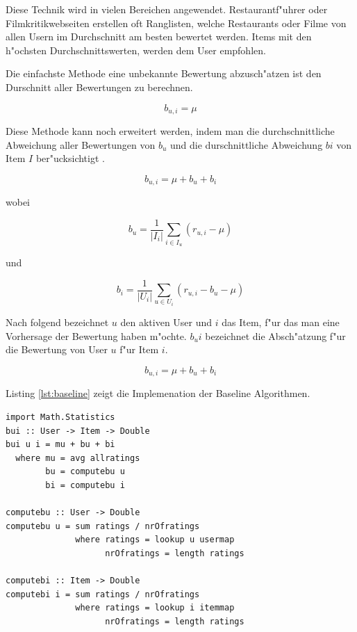 \documentclass[a4paper, 12pt]{article}
\begin{document}
Diese Technik wird in vielen Bereichen angewendet. Restaurantf"uhrer oder Filmkritikwebseiten erstellen oft Ranglisten, welche Restaurants oder Filme von allen Usern im Durchschnitt am besten bewertet werden. Items mit den h"ochsten Durchschnittswerten, werden dem User empfohlen.

Die einfachste Methode eine unbekannte Bewertung abzusch"atzen ist den Durschnitt aller Bewertungen zu berechnen.

\begin{equation}
  \label{eq:avg}
  b_{u,i} = \mu
\end{equation}

Diese Methode kann noch erweitert werden, indem man die durchschnittliche Abweichung aller Bewertungen von $b_u$ und die durschnittliche Abweichung $bi$ von Item $I$ ber"ucksichtigt \cite{jannach11}.

\begin{equation}
  \label{eq:bui}
  b_{u,i} = \mu + b_u + b_i
\end{equation}

wobei

\begin{equation}
  b_u = \frac{1}{|I_i|}\sum_{i \in I_u}(r_{u,i} - \mu)
\end{equation}

und 

\begin{equation}
  \label{eq:bi}
  b_i = \frac{1}{|U_i|}\sum_{u \in U_i}(r_{u,i} - b_u - \mu)
\end{equation}

Nach folgend bezeichnet $u$ den aktiven User und $i$ das Item, f"ur das man eine Vorhersage der Bewertung haben m"ochte. $b_ui$ bezeichnet die Absch"atzung f"ur die Bewertung von User $u$ f"ur Item $i$.

\begin{equation}
  \label{eq:baseline}
  b_{u,i} = \mu + b_u + b_i
\end{equation}

Listing \ref{lst:baseline} zeigt die Implemenation der Baseline Algorithmen.

\begin{lstlisting}[caption=Baseline predictor, label=lst:baseline]
import Math.Statistics
bui :: User -> Item -> Double
bui u i = mu + bu + bi
  where mu = avg allratings
        bu = computebu u
        bi = computebu i

computebu :: User -> Double
computebu u = sum ratings / nrOfratings
              where ratings = lookup u usermap
                    nrOfratings = length ratings

computebi :: Item -> Double
computebi i = sum ratings / nrOfratings
              where ratings = lookup i itemmap
                    nrOfratings = length ratings
\end{lstlisting}
\end{document}
